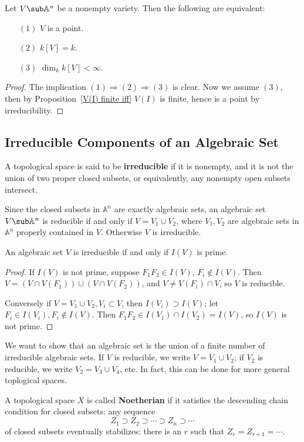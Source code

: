 \begin{proposition}
Let $V\sub\mathbb{A}^n$ be a nonempty variety. Then the following are equivalent:
\begin{itemize}
\item[$(1)$] $V$ is a point.
\item[$(2)$] $k[V]=k$.
\item[$(3)$] $\dim_kk[V]<\infty$.
\end{itemize}
\end{proposition}
\begin{proof}
The implication $(1)\Rightarrow(2)\Rightarrow(3)$ is clear. Now we assume $(3)$, then by Proposition~\ref{V(I) finite iff} $V(I)$ is finite, hence is a point by irreducibility.
\end{proof}
\subsection{Irreducible Components of an Algebraic Set}
\begin{definition}
A topological space is said to be \textbf{irreducible} if it is nonempty, and it is not the union of two proper closed subsets, or equivalently, any nonempty open subsets intersect.
\end{definition} 
Since the closed subsets in $\mathbb{A}^n$ are exactly algebraic sets, an algebraic set $V\sub\mathbb{A}^n$ is reducible if and only if $V=V_1\cup V_2$, where $V_1,V_2$ are algebraic sets in $\mathbb{A}^n$ properly contained in $V$. Otherwise $V$ is irreducible.
\begin{proposition}\label{algebraic set irre}
An algebraic set $V$ is irreducible if and only if $I(V)$ is prime.
\end{proposition}
\begin{proof}
If $I(V)$ is not prime, suppose $F_1F_2\in I(V)$, $F_i\notin I(V)$. Then $V=(V\cap V(F_1))\cup(V\cap V(F_2))$, and $V\neq V(F_i)\cap V$, so $V$ is reducible.\par
Conversely if $V=V_1\cup V_2, V_i\subset V$, then $I(V_i)\supset I(V)$; let $F_i\in I(V_i),F_i\notin I(V)$. Then $F_1F_2\in I(V_1)\cap I(V_2)=I(V)$, so $I(V)$ is not prime.
\end{proof}
We want to show that an algebraic set is the union of a finite number of irreducible algebraic sets. If $V$ is reducible, we write $V=V_1\cup V_2$; if $V_2$ is reducible, we write $V_2=V_3\cup V_4$, etc. In fact, this can be done for more general toplogical spaces.
\begin{definition}
A topological space $X$ is called \textbf{Noetherian} if it satisfies the descending chain condition for closed subsets: any sequence 
\[Z_1\supset Z_2\supset\cdots\supset Z_n\supset\cdots\]
of closed subsets eventually stabilizes: there is an $r$ such that $Z_{r}=Z_{r+1}=\cdots$.
\end{definition}
